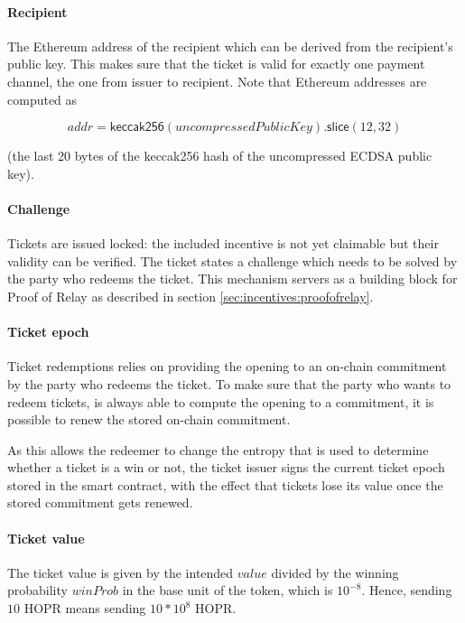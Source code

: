 \paragraph{Recipient}
\label{sec:tickets:issuance:recipient}

The Ethereum address of the recipient which can be derived from the recipient's public key. This makes sure that the ticket is valid for exactly one payment channel, the one from issuer to recipient. Note that Ethereum addresses are computed as

$$ addr = \mathsf{keccak256}( uncompressedPublicKey).\mathsf{slice}(12,32)$$

(the last 20 bytes of the keccak256 hash of the uncompressed ECDSA public key).

\paragraph{Challenge}
\label{sec:tickets:issuance:challenge}

Tickets are issued locked: the included incentive is not yet claimable but their validity can be verified. The ticket states a challenge which needs to be solved by the party who redeems the ticket. This mechanism servers as a building block for Proof of Relay as described in section \ref{sec:incentives:proofofrelay}.

\paragraph{Ticket epoch}
\label{sec:tickets:issuance:ticketepoch}

Ticket redemptions relies on providing the opening to an on-chain commitment by the party who redeems the ticket. To make sure that the party who wants to redeem tickets, is always able to compute the opening to a commitment, it is possible to renew the stored on-chain commitment.

As this allows the redeemer to change the entropy that is used to determine whether a ticket is a win or not, the ticket issuer signs the current ticket epoch stored in the smart contract, with the effect that tickets lose its value once the stored commitment gets renewed.

\paragraph{Ticket value}
\label{sec:tickets:issuance:ticketvalue}

The ticket value is given by the intended $value$ divided by the winning probability $winProb$ in the base unit of the token, which is $10^{-8}$. Hence, sending $10$ HOPR means sending $10 * 10^8$ HOPR.

